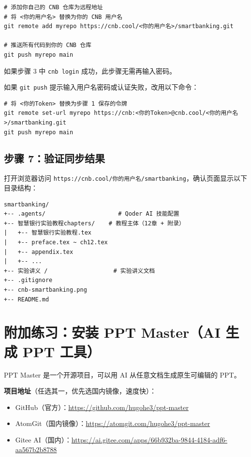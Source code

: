\begin{lstlisting}[style=shell]
# 添加你自己的 CNB 仓库为远程地址
# 将 <你的用户名> 替换为你的 CNB 用户名
git remote add myrepo https://cnb.cool/<你的用户名>/smartbanking.git

# 推送所有代码到你的 CNB 仓库
git push myrepo main
\end{lstlisting}

如果步骤 3 中 \texttt{cnb login} 成功，此步骤无需再输入密码。

如果 \texttt{git push} 提示输入用户名密码或认证失败，改用以下命令：

\begin{lstlisting}[style=shell]
# 将 <你的Token> 替换为步骤 1 保存的令牌
git remote set-url myrepo https://cnb:<你的Token>@cnb.cool/<你的用户名>/smartbanking.git
git push myrepo main
\end{lstlisting}

\subsection{步骤 7：验证同步结果}

打开浏览器访问 \texttt{https://cnb.cool/你的用户名/smartbanking}，确认页面显示以下目录结构：

\begin{lstlisting}[style=shell]
smartbanking/
+-- .agents/                     # Qoder AI 技能配置
+-- 智慧银行实验教程chapters/    # 教程主体（12章 + 附录）
|   +-- 智慧银行实验教程.tex
|   +-- preface.tex ~ ch12.tex
|   +-- appendix.tex
|   +-- ...
+-- 实验讲义 /                   # 实验讲义文档
+-- .gitignore
+-- cnb-smartbanking.png
+-- README.md
\end{lstlisting}

\section{附加练习：安装 PPT Master（AI 生成 PPT 工具）}

PPT Master 是一个开源项目，可以用 AI 从任意文档生成原生可编辑的 PPT。

\textbf{项目地址}（任选其一，优先选国内镜像，速度快）：
\begin{itemize}[leftmargin=1em]
  \item GitHub（官方）：\url{https://github.com/hugohe3/ppt-master}
  \item AtomGit（国内镜像）：\url{https://atomgit.com/hugohe3/ppt-master}
  \item Gitee AI（国内）：\url{https://ai.gitee.com/apps/66b932ba-9844-4184-adf6-aa567b2b8788}
\end{itemize}

